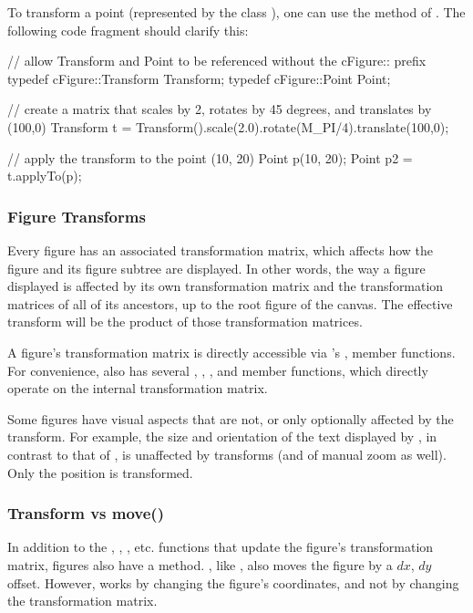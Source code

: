 To transform a point (represented by the class ),
one can use the  method of . The
following code fragment should clarify this:

\begin{cpp}
// allow Transform and Point to be referenced without the cFigure:: prefix
typedef cFigure::Transform Transform;
typedef cFigure::Point Point;

// create a matrix that scales by 2, rotates by 45 degrees, and translates by (100,0)
Transform t = Transform().scale(2.0).rotate(M_PI/4).translate(100,0);

// apply the transform to the point (10, 20)
Point p(10, 20);
Point p2 = t.applyTo(p);
\end{cpp}


\subsubsection{Figure Transforms}

Every figure has an associated transformation matrix, which
affects how the figure and its figure subtree are displayed.
In other words, the way a figure displayed is affected by its own
transformation matrix and the transformation matrices of all of its
ancestors, up to the root figure of the canvas. The effective transform
will be the product of those transformation matrices.

A figure's transformation matrix is directly accessible via 's
,  member functions.
For convenience,  also has several , ,
,  and  member functions,
which directly operate on the internal transformation matrix.

Some figures have visual aspects that are not, or only optionally affected
by the transform. For example, the size and orientation of the text
displayed by , in contrast to that of
, is unaffected by transforms (and of manual zoom as
well). Only the position is transformed.

\subsubsection{Transform vs move()}

In addition to the , , ,
etc. functions that update the figure's transformation matrix, figures also
have a  method. , like ,
also moves the figure by a $dx$, $dy$ offset. However,  works
by changing the figure's coordinates, and not by changing the
transformation matrix.

